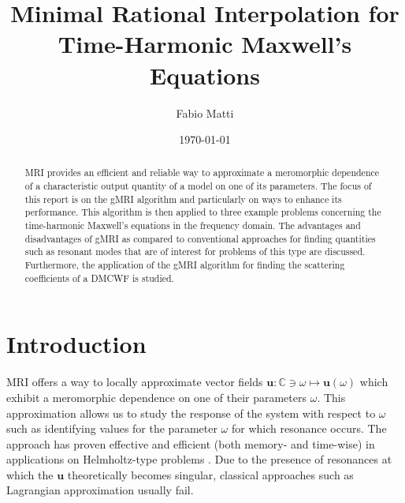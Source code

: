 \documentclass[11pt, a4paper]{article}
\title{Minimal Rational Interpolation for Time-Harmonic Maxwell's Equations}
\author{Fabio Matti}
\date{\today}
\begin{document}
\maketitle

\begin{abstract}
    \acrfull{MRI} provides an efficient and reliable way to approximate
    a meromorphic dependence of a characteristic output quantity of a model on one
    of its parameters.
    The focus of this report is on the \acrfull{gMRI} algorithm and particularly
    on ways to enhance its performance. This algorithm is then applied to three 
    example problems concerning the time-harmonic Maxwell's equations in the 
    frequency domain. The advantages and disadvantages of
    \acrshort{gMRI} as compared to conventional approaches for finding quantities
    such as resonant modes that are of interest for problems of this type are discussed.
    Furthermore, the application of the \acrshort{gMRI} algorithm for finding the 
    scattering coefficients of a \acrfull{DMCWF} is studied.
\end{abstract}

\newpage
\tableofcontents

\newpage
\section{Introduction}
\label{sec:introduction}


\acrfull{MRI} offers a way to locally approximate vector fields
$\mathbf{u}:\mathbb{C}\ni\omega\mapsto \mathbf{u}(\omega)$
which exhibit a meromorphic dependence on one of their 
parameters $\omega$. This approximation allows us to study the response of the
system with respect to $\omega$ such as identifying values for the parameter
$\omega$ for which resonance occurs. The approach has proven
effective and efficient (both memory- and time-wise) in applications
on Helmholtz-type problems \cite{greedyMRI, shortMRI}. Due to the presence of 
resonances at which the $\mathbf{u}$ theoretically becomes singular, classical
approaches such as Lagrangian approximation usually fail.
\end{document}
